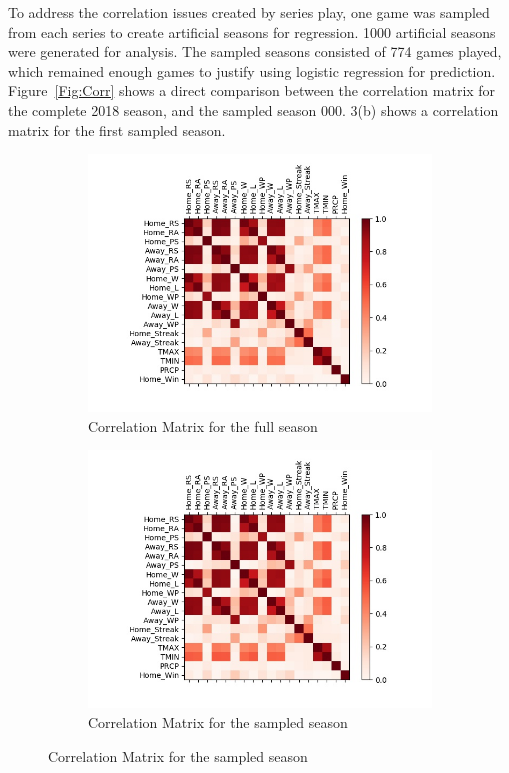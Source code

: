 \documentclass{article}
\begin{document}
To address the correlation issues created by series play,
one game was sampled from each series to create artificial seasons for
regression.
1000 artificial seasons were generated for analysis.
The sampled seasons consisted of 774 games played,
which remained enough games to justify using logistic regression for 
prediction.
Figure~\ref{Fig:Corr} shows a direct comparison between the correlation matrix
for the complete 2018 season,
and the sampled season 000.
3(b) shows a correlation matrix for the first sampled 
season.
\begin{figure}
    \centering
    \begin{subfigure}{0.75\textwidth}
         \includegraphics[width=\textwidth]{full-season/combined-stats-corr-mat.jpg}
         \caption{Correlation Matrix for the full season}
         \label{Fig:SeasonCorr}
    \end{subfigure}
    
    \begin{subfigure}{0.75\textwidth}
         \includegraphics[width=\textwidth]{sampled-season/combined-stats-corr-mat.jpg}
         \caption{Correlation Matrix for the sampled season}
         \label{Fig:SampleCorr}
    \end{subfigure}


\end{figure}
\end{document}
